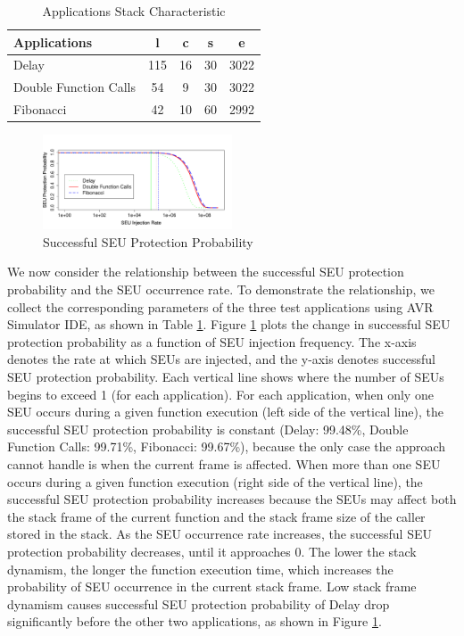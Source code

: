 \begin{table}
	\center
    \begin{tabular}{|l|c|c|c|c|}
    \hline
    \textbf{ Applications}   & \textbf{l} & \textbf{c} & \textbf{s} & \textbf{e}	\\ \hline
    Delay         				& 115			& 16		& 30		& 3022		\\ \hline
    Double Function Calls       & 54			& 9			& 30        & 3022		\\ \hline
    Fibonacci             		& 42			& 10		& 60	   	& 2992		\\ \hline
    \end{tabular}
    \caption {Applications Stack Characteristic}
    \label{tbl_application_parameters}
\end{table}
\begin{figure}
\centering
\includegraphics[width=0.5\textwidth]{figures/success_probability_v1.pdf}
\caption{Successful SEU Protection Probability}
\label{fig:success_probability}
\end{figure}
We now consider the relationship between the successful SEU protection probability and the SEU occurrence rate. To demonstrate the relationship, we collect the corresponding parameters of the three test applications using AVR Simulator IDE, as shown in Table \ref{tbl_application_parameters}. Figure \ref{fig:success_probability} plots the change in successful SEU protection probability as a function of SEU injection frequency. The x-axis denotes the rate at which SEUs are injected, and the y-axis denotes successful SEU protection probability. Each vertical line shows where the number of SEUs begins to exceed 1 (for each application). For each application, when only one SEU occurs during a given function execution (left side of the vertical line), the successful SEU protection probability is constant (Delay: 99.48\%, Double Function Calls: 99.71\%, Fibonacci: 99.67\%), because the only case the approach cannot handle is when the current frame is affected. When more than one SEU occurs during a given function execution (right side of the vertical line), the successful SEU protection probability increases because the SEUs may affect both the stack frame of the current function and the stack frame size of the caller stored in the stack. As the SEU occurrence rate increases, the successful SEU protection probability decreases, until it approaches 0. The lower the stack dynamism, the longer the function execution time, which increases the probability of SEU occurrence in the current stack frame. Low stack frame dynamism causes successful SEU protection probability of Delay drop significantly before the other two applications, as shown in Figure \ref{fig:success_probability}.

